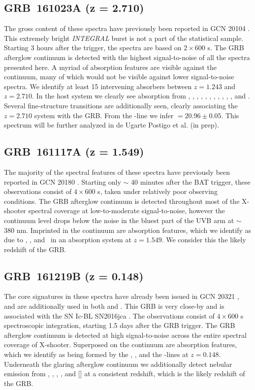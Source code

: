 \documentclass[longauth]{aa}    %
\begin{document}
\subsection{GRB~161023A (z = 2.710)}\label{161023}

The gross content of these spectra have previously been reported in GCN 20104
\citep{GCN20104}. This extremely bright \textit{INTEGRAL} burst is not a part of
the statistical sample. Starting 3 hours after the trigger, the spectra are
based on $2 \times 600$ s. The GRB afterglow continuum is detected with the
highest signal-to-noise of all the spectra presented here. A myriad of
absorption features are visible against the continuum, many of which would not be
visible against lower signal-to-noise spectra. We identify at least 15
intervening absorbers between $z = 1.243$ and $z = 2.710$. In the host system we
clearly see absorption from \lyb, \lya, \sii, \SIii, \oi, \SIiv, \civ, \alii,
\aliii, \feii, \mgii, and \mgi. Several fine-structure transitions are
additionally seen, clearly associating the $z = 2.710$ system with the GRB. From
the \lya-line we infer \nh$=20.96 \pm 0.05$. This spectrum will be further analyzed in de Ugarte Postigo et al. (in prep).

\subsection{GRB~161117A (z = 1.549)}\label{161117}

The majority of the spectral features of these spectra have previously been
reported in GCN 20180 \citep{GCN20180}. Starting only $\sim$ 40 minutes after
the BAT trigger, these observations consist of $4 \times 600$ s, taken under
relatively poor observing conditions. The GRB afterglow continuum is detected
throughout most of the X-shooter spectral coverage at low-to-moderate
signal-to-noise, however the continuum level drops below the noise in the bluest
part of the UVB arm at $\sim$ 380 nm. Imprinted in the continuum are
absorption features, which we identify as due to \feii, \mgii, and \mgi~in an
absorption system at $z = 1.549$. We consider this the likely redshift of the
GRB.

\subsection{GRB~161219B (z = 0.148)}\label{161219}

The core signatures in these spectra have already been issued in GCN 20321
\citep{GCN20321}, and are additionally used in both \citet{Ashall2017} and
\citet{Cano2017}. This GRB is very close-by and is associated with the SN
Ic-BL SN2016jca \citep[GCN 20342;][]{GCN20342}. The observations consist of $4
\times 600$ s spectroscopic integration, starting 1.5 days after the GRB
trigger. The GRB afterglow continuum is detected at high signal-to-noise across
the entire spectral coverage of X-shooter. Superposed on the continuum are
absorption features, which we identify as being formed by the \mgii, \mgi, and
the \cahk-lines at $z = 0.148$. Underneath the glaring afterglow continuum we
additionally detect nebular emission from \oii, \hb, \oiii, \ha, and [\sii] at a
consistent redshift, which is the likely redshift of the GRB.
\end{document}
